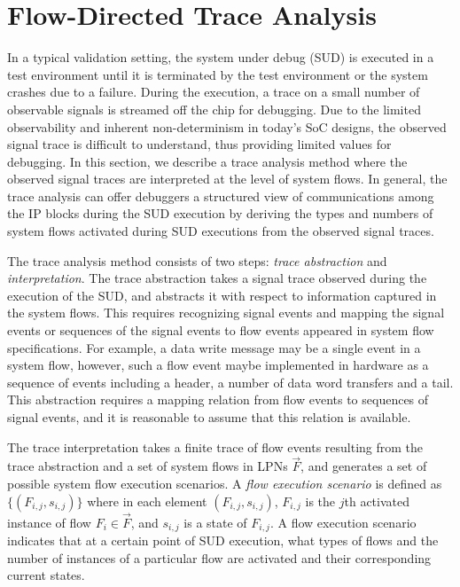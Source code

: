 \documentclass[conference]{IEEEtran}
\begin{document}
\section{Flow-Directed Trace Analysis}

In a typical validation setting, the system under debug (SUD) is executed in a test environment until it is terminated by the test environment or the system crashes due to a failure.  During the execution, a trace on a small number of observable signals is streamed off the chip for debugging.  Due to the limited observability and inherent non-determinism in today's SoC designs, the observed signal trace is difficult to understand, thus providing limited values for debugging.  In this section, we describe a trace analysis method where the observed signal traces are interpreted at the level of system flows.  In general, the trace analysis can offer debuggers a structured view of communications among the IP blocks during the SUD execution by deriving the types and numbers of system flows activated during SUD executions from the observed signal traces.

The trace analysis method consists of two steps: \emph{trace abstraction} and \emph{interpretation}.  The trace abstraction takes a signal trace observed during the execution of the SUD, and abstracts it with respect to information captured in the system flows.  This requires recognizing signal events and mapping the signal events or sequences of the signal events to flow events appeared in system flow specifications.  For example, a data write message may be a single event in a system flow, however, such a flow event maybe implemented in hardware as a sequence of events including a header, a number of data word transfers and a tail.  This abstraction requires a mapping relation from flow events to sequences of signal events, and it is reasonable to assume that this relation is available.

The trace interpretation takes a finite trace of flow events resulting from the trace abstraction and a set of system flows in LPNs $\vec{F}$, and generates a set of possible system flow execution scenarios.  A \emph{flow execution scenario} is defined as $\{(F_{i,j}, s_{i,j})\}$ where in each element $(F_{i,j}, s_{i,j})$, $F_{i,j}$ is the $j$th activated instance of flow $F_i \in \vec{F}$, and $s_{i,j}$ is a state of $F_{i,j}$.  A flow execution scenario indicates that at a certain point of SUD execution, what types of flows and the number of instances of a particular flow are activated and their corresponding current states.
\end{document}
